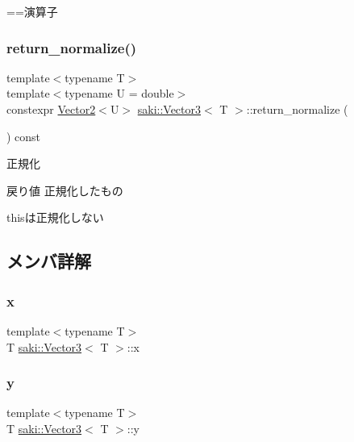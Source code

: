 ==演算子 

\mbox{\label{classsaki_1_1_vector3_ab4bbc1a8a3cbf860996a5136b3c1536f}} 
\subsubsection{\texorpdfstring{return\+\_\+normalize()}{return\_normalize()}}
{\footnotesize\ttfamily template$<$typename T$>$ \\
template$<$typename U  = double$>$ \\
constexpr \mbox{\hyperlink{classsaki_1_1_vector2}{Vector2}}$<$U$>$ \mbox{\hyperlink{classsaki_1_1_vector3}{saki\+::\+Vector3}}$<$ T $>$\+::return\+\_\+normalize (\begin{DoxyParamCaption}{ }\end{DoxyParamCaption}) const\hspace{0.3cm}{\ttfamily [inline]}}



正規化 

\begin{DoxyReturn}{戻り値}
正規化したもの
\end{DoxyReturn}
thisは正規化しない 

\subsection{メンバ詳解}
\mbox{\label{classsaki_1_1_vector3_a1fa58e9e75dbeb650afb3db740f3131c}} 
\subsubsection{\texorpdfstring{x}{x}}
{\footnotesize\ttfamily template$<$typename T$>$ \\
T \mbox{\hyperlink{classsaki_1_1_vector3}{saki\+::\+Vector3}}$<$ T $>$\+::x}

\mbox{\label{classsaki_1_1_vector3_aba41be4543769bd023387691acf654dd}} 
\subsubsection{\texorpdfstring{y}{y}}
{\footnotesize\ttfamily template$<$typename T$>$ \\
T \mbox{\hyperlink{classsaki_1_1_vector3}{saki\+::\+Vector3}}$<$ T $>$\+::y}

